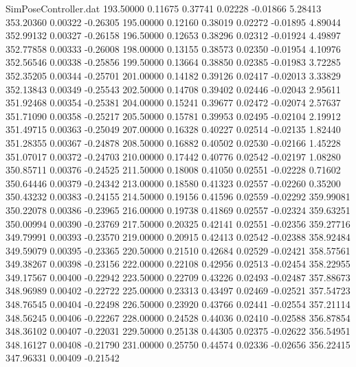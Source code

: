 \begin{filecontents}{SimPoseController.dat}
 193.50000    0.11675    0.37741     0.02228   -0.01866    5.28413  353.20360    0.00322   -0.26305
 195.00000    0.12160    0.38019     0.02272   -0.01895    4.89044  352.99132    0.00327   -0.26158
 196.50000    0.12653    0.38296     0.02312   -0.01924    4.49897  352.77858    0.00333   -0.26008
 198.00000    0.13155    0.38573     0.02350   -0.01954    4.10976  352.56546    0.00338   -0.25856
 199.50000    0.13664    0.38850     0.02385   -0.01983    3.72285  352.35205    0.00344   -0.25701
 201.00000    0.14182    0.39126     0.02417   -0.02013    3.33829  352.13843    0.00349   -0.25543
 202.50000    0.14708    0.39402     0.02446   -0.02043    2.95611  351.92468    0.00354   -0.25381
 204.00000    0.15241    0.39677     0.02472   -0.02074    2.57637  351.71090    0.00358   -0.25217
 205.50000    0.15781    0.39953     0.02495   -0.02104    2.19912  351.49715    0.00363   -0.25049
 207.00000    0.16328    0.40227     0.02514   -0.02135    1.82440  351.28355    0.00367   -0.24878
 208.50000    0.16882    0.40502     0.02530   -0.02166    1.45228  351.07017    0.00372   -0.24703
 210.00000    0.17442    0.40776     0.02542   -0.02197    1.08280  350.85711    0.00376   -0.24525
 211.50000    0.18008    0.41050     0.02551   -0.02228    0.71602  350.64446    0.00379   -0.24342
 213.00000    0.18580    0.41323     0.02557   -0.02260    0.35200  350.43232    0.00383   -0.24155
 214.50000    0.19156    0.41596     0.02559   -0.02292  359.99081  350.22078    0.00386   -0.23965
 216.00000    0.19738    0.41869     0.02557   -0.02324  359.63251  350.00994    0.00390   -0.23769
 217.50000    0.20325    0.42141     0.02551   -0.02356  359.27716  349.79991    0.00393   -0.23570
 219.00000    0.20915    0.42413     0.02542   -0.02388  358.92484  349.59079    0.00395   -0.23365
 220.50000    0.21510    0.42684     0.02529   -0.02421  358.57561  349.38267    0.00398   -0.23156
 222.00000    0.22108    0.42956     0.02513   -0.02454  358.22955  349.17567    0.00400   -0.22942
 223.50000    0.22709    0.43226     0.02493   -0.02487  357.88673  348.96989    0.00402   -0.22722
 225.00000    0.23313    0.43497     0.02469   -0.02521  357.54723  348.76545    0.00404   -0.22498
 226.50000    0.23920    0.43766     0.02441   -0.02554  357.21114  348.56245    0.00406   -0.22267
 228.00000    0.24528    0.44036     0.02410   -0.02588  356.87854  348.36102    0.00407   -0.22031
 229.50000    0.25138    0.44305     0.02375   -0.02622  356.54951  348.16127    0.00408   -0.21790
 231.00000    0.25750    0.44574     0.02336   -0.02656  356.22415  347.96331    0.00409   -0.21542

\end{filecontents}
